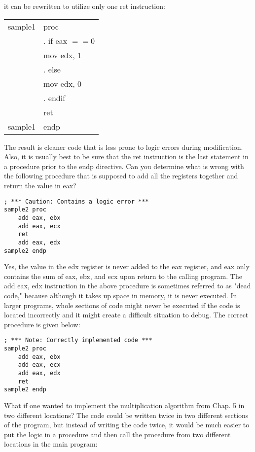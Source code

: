 \documentclass[10pt]{article}
\begin{document}
it can be rewritten to utilize only one ret instruction:

\begin{center}
\begin{tabular}{ll}
sample1 & proc \\
 & . if eax $==0$ \\
 & mov edx, 1 \\
 & . else \\
 & mov edx, 0 \\
 & . endif \\
 & ret \\
sample1 & endp \\
\end{tabular}
\end{center}

The result is cleaner code that is less prone to logic errors during modification. Also, it is usually best to be sure that the ret instruction is the last statement in a procedure prior to the endp directive. Can you determine what is wrong with the following procedure that is supposed to add all the registers together and return the value in eax?

\begin{verbatim}
; *** Caution: Contains a logic error ***
sample2 proc
    add eax, ebx
    add eax, ecx
    ret
    add eax, edx
sample2 endp
\end{verbatim}

Yes, the value in the edx register is never added to the eax register, and eax only contains the sum of eax, ebx, and ecx upon return to the calling program. The add eax, edx instruction in the above procedure is sometimes referred to as "dead code," because although it takes up space in memory, it is never executed. In larger programs, whole sections of code might never be executed if the code is located incorrectly and it might create a difficult situation to debug. The correct procedure is given below:

\begin{verbatim}
; *** Note: Correctly implemented code ***
sample2 proc
    add eax, ebx
    add eax, ecx
    add eax, edx
    ret
sample2 endp
\end{verbatim}

What if one wanted to implement the multiplication algorithm from Chap. 5 in two different locations? The code could be written twice in two different sections of the program, but instead of writing the code twice, it would be much easier to put the logic in a procedure and then call the procedure from two different locations in the main program:
\end{document}
